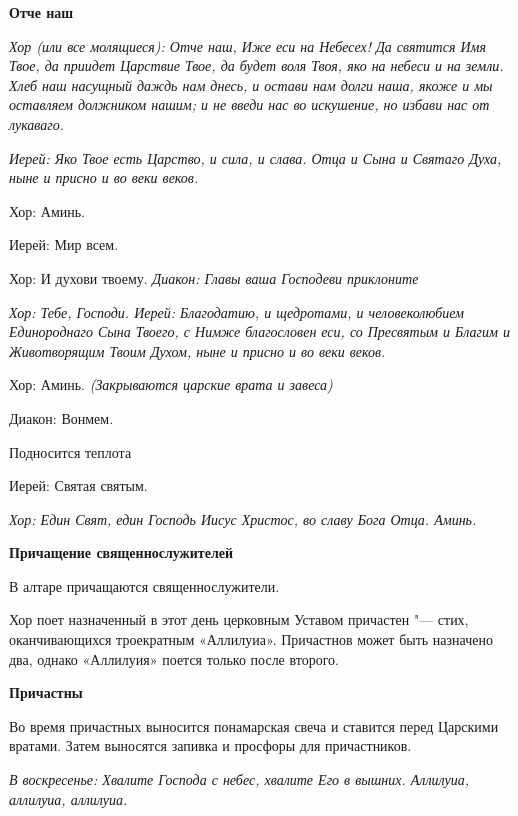 \medskip


 \bfseries  Отче наш \normalfont{}


\itshape  Хор (или все молящиеся):\normalfont{} Отче наш, Иже еси на Небесех! Да святится Имя Твое, да приидет Царствие Твое, да будет воля Твоя, яко на небеси и на земли. Хлеб наш насущный даждь нам днесь, и остави нам долги наша, якоже и мы оставляем должником нашим; и не введи нас во искушение, но избави нас от лукаваго. 


\itshape  Иерей:\normalfont{} Яко Твое есть Царство, и сила, и слава. Отца и Сына и Святаго Духа, ныне и присно и во веки веков. \itshape 


  Хор:\normalfont{} Аминь. \itshape 


  Иерей:\normalfont{} Мир всем. \itshape 


  Хор:\normalfont{} И духови твоему. \itshape  Диакон:\normalfont{} Главы ваша Господеви приклоните


\itshape Хор:\normalfont{} Тебе, Господи. \itshape  Иерей:\normalfont{} Благодатию, и щедротами, и человеколюбием Единороднаго Сына Твоего, с Нимже благословен еси, со Пресвятым и Благим и Животворящим Твоим Духом, ныне и присно и во веки веков. \itshape 


  Хор:\normalfont{} Аминь. \itshape  (Закрываются царские врата и завеса)


  Диакон:\normalfont{} Вонмем. \itshape 


  Подносится теплот\normalfont{}а \itshape 


  Иерей:\normalfont{} Святая святым. 


\itshape  Хор:\normalfont{} Един Свят, един Господь Иисус Христос, во славу Бога Отца. Аминь. 


\medskip


\bfseries  Причащение священнослужителей \normalfont{}\nopagebreak


  В алтаре причащаются священнослужители. 


Хор поет назначенный в этот день церковным Уставом причастен "--- стих, оканчивающихся троекратным «Аллилуиа». Причастнов может быть назначено два, однако «Аллилуия» поется только после второго. 


\medskip


\bfseries  Причастны \normalfont{}\nopagebreak


      Во время причастных выносится понамарская свеча и ставится перед Царскими вратами. Затем выносятся запивка и просфоры для причастников.


\itshape  В воскресенье:\normalfont{} Хвалите Господа с небес, хвалите Его в вышних. Аллилуиа, аллилуиа, аллилуиа. 


